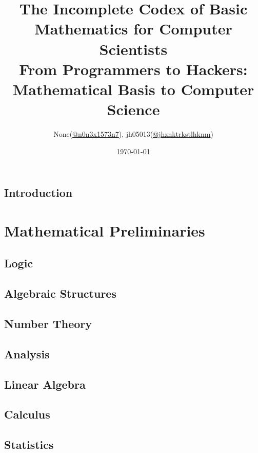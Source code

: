 \documentclass{report}
\title{
	The Incomplete Codex of Basic Mathematics for Computer Scientists\\
	\large From Programmers to Hackers: Mathematical Basis to Computer Science
}
\author{None(\href{https://www.twitter.com/n0n3x1573n7}{@n0n3x1573n7}), jh05013(\href{https://twitter.com/jhznktrkstlhknm}{@jhznktrkstlhknm})}
\date{\today}
\theoremstyle{break}
\begin{document}
	\maketitle

	\chapter{Introduction}
		
	
	\tableofcontents
	
	\part{Mathematical Preliminaries}
	
		\chapter{Logic}
			

		\chapter{Algebraic Structures}
			
	
		\chapter{Number Theory}
			
	
		\chapter{Analysis}
			
		
		\chapter{Linear Algebra}
			
		
		\chapter{Calculus}
			
		
		\chapter{Statistics}
			
			
\end{document}
